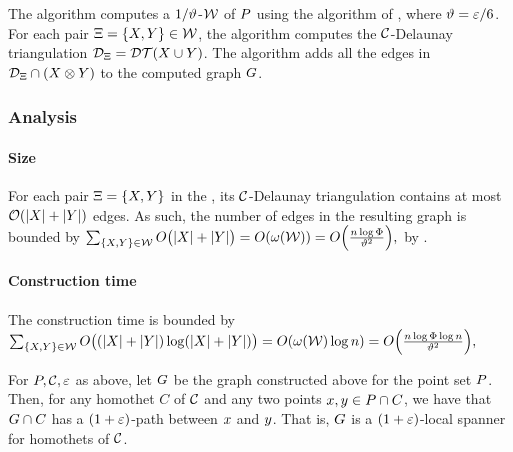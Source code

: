 \documentclass[12pt]{article}%
\begin{document}
The algorithm computes a $1/\vartheta$-\WSPD $\mathcal{W}$ of $P$ using the
algorithm of , where $\vartheta = \varepsilon/6$.  For
each pair $\Xi = \{X, Y \} \in \mathcal{W}$, the algorithm computes
the $\mathcal{C}$-Delaunay triangulation
$\DT_{\Pair} = \DTX{ \PSX \cup \PSY}$. The algorithm adds all the
edges in $\mathcal{D}_{\Xi} \cap (X \otimes Y)$ to the computed graph
$G$.

\subsubsection{Analysis}

\paragraph{Size}

For each pair $\Xi = \{X, Y\}$ in the \WSPD, its
$\mathcal{C}$-Delaunay triangulation contains at most $\mathcal{O}( |X| + |Y|)$
edges. As such, the number of edges in the resulting graph is bounded
by
\begin{math}
    \sum_{\{\PSX, \PSY\} \in \WS} O\bigl( |\PSX| + |\PSY| \bigr) =%
    O\pth{ \WeightX{\WS} }%
    =%
    O\pth{ \frac{n\log \spread}{{\epsA}^{2}}},
\end{math}
by .


\paragraph{Construction time}
The construction time is bounded by
\begin{math}
    \sum_{\{\PSX, \PSY\} \in \WS} O\bigl( (|\PSX| + |\PSY|) \log
    (|\PSX| + |\PSY|)  \bigr)
    =%
    O\pth{ \WeightX{\WS} \log n }%
    =%
    O\pth{ \frac{n\log \spread \log n}{{\epsA}^{2}}},    
\end{math}

\begin{lemma}
    For $P, \mathcal{C}, \varepsilon$ as above, let $G$ be the graph constructed
    above for the point set $P$. Then, for any homothet $C$ of $\mathcal{C}$
    and any two points $x, y \in P \cap C$, we have that
    $G \cap {C}$ has a $(1+\varepsilon)$-path between $x$ and
    $y$. That is, $G$ is a $(1+\varepsilon)$-local spanner for homothets
    of $\mathcal{C}$.
\end{lemma}
\end{document}
